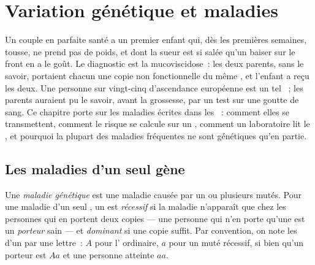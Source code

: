 \chapter{Variation génétique et maladies}\label{ch:g11:genes-and-disease}

Un couple en parfaite santé a un premier enfant qui, dès les premières
semaines, tousse, ne prend pas de poids, et dont la sueur est si salée
qu'un baiser sur le front en a le goût. Le diagnostic est la
mucoviscidose~: les deux parents, sans le savoir, portaient chacun une
copie non fonctionnelle du même , et l'enfant a reçu les deux. Une
personne sur vingt-cinq d'ascendance européenne est un tel ~;
les parents auraient pu le savoir, avant la grossesse, par un test sur
une goutte de sang. Ce chapitre porte sur les maladies écrites dans les
~: comment elles se transmettent, comment le risque se calcule
sur un , comment un laboratoire lit le , et
pourquoi la plupart des maladies fréquentes ne sont génétiques qu'en
partie.

\section{Les maladies d'un seul gène}

\begin{definition}\label{def:g11:genes-and-disease:genetic}
Une \emph{maladie génétique} est une maladie
causée par un ou plusieurs  mutés. Pour une maladie d'un seul
, un  est \emph{récessif} si la maladie
n'apparaît que chez les personnes qui en portent deux copies --- une
personne qui n'en porte qu'une est un \emph{porteur}
sain --- et \emph{dominant} si une copie suffit. Par
convention, on note les  d'un  par une lettre~: $A$ pour
l' ordinaire, $a$ pour un  muté récessif, si bien qu'un
porteur est $Aa$ et une personne atteinte $aa$.
\end{definition}

